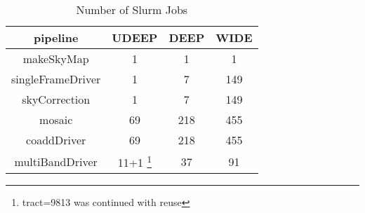 \begin{table}
\centering
\begin{tabular} {|c|c|c|c|}
\hline
pipeline & UDEEP & DEEP & WIDE \\
\hline
makeSkyMap & 1 & 1 & 1 \\
singleFrameDriver&1 & 7 & 149 \\
skyCorrection&1 & 7 & 149 \\
mosaic&69 & 218 & 455 \\
coaddDriver&69 & 218 & 455 \\
multiBandDriver &11+1 \footnote{tract=9813 was continued with reuse} & 37 & 91 \\
\hline
\end{tabular}
\caption{Number of Slurm Jobs}
\label{table1}
\end{table}
